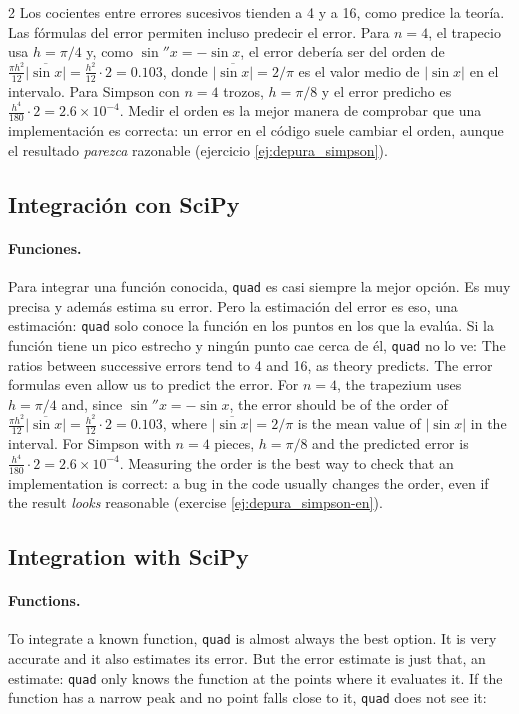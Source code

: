 \begin{paracol}{2}
Los cocientes entre errores sucesivos tienden a 4 y a 16, como predice la teoría. Las fórmulas del error permiten incluso predecir el error. Para $n=4$, el trapecio usa $h=\pi/4$ y, como $\sin''x=-\sin x$, el error debería ser del orden de $\frac{\pi h^2}{12}\overline{\lvert\sin x\rvert}=\frac{h^2}{12}\cdot 2=0.103$, donde $\overline{\lvert\sin x\rvert}=2/\pi$ es el valor medio de $\lvert\sin x\rvert$ en el intervalo. Para Simpson con $n=4$ trozos, $h=\pi/8$ y el error predicho es $\frac{h^4}{180}\cdot 2=2.6\times10^{-4}$. Medir el orden es la mejor manera de comprobar que una implementación es correcta: un error en el código suele cambiar el orden, aunque el resultado \emph{parezca} razonable (ejercicio \ref{ej:depura_simpson}).

\subsection{Integración con SciPy}
\paragraph*{Funciones.} Para integrar una función conocida, \texttt{quad} es casi siempre la mejor opción. Es muy precisa y además estima su error. Pero la estimación del error es eso, una estimación: \texttt{quad} solo conoce la función en los puntos en los que la evalúa. Si la función tiene un pico estrecho y ningún punto cae cerca de él, \texttt{quad} no lo ve:
\switchcolumn
The ratios between successive errors tend to 4 and 16, as theory predicts. The error formulas even allow us to predict the error. For $n=4$, the trapezium uses $h=\pi/4$ and, since $\sin''x=-\sin x$, the error should be of the order of $\frac{\pi h^2}{12}\overline{\lvert\sin x\rvert}=\frac{h^2}{12}\cdot 2=0.103$, where $\overline{\lvert\sin x\rvert}=2/\pi$ is the mean value of $\lvert\sin x\rvert$ in the interval. For Simpson with $n=4$ pieces, $h=\pi/8$ and the predicted error is $\frac{h^4}{180}\cdot 2=2.6\times10^{-4}$. Measuring the order is the best way to check that an implementation is correct: a bug in the code usually changes the order, even if the result \emph{looks} reasonable (exercise \ref{ej:depura_simpson-en}).

\subsection{Integration with SciPy}
\paragraph*{Functions.} To integrate a known function, \texttt{quad} is almost always the best option. It is very accurate and it also estimates its error. But the error estimate is just that, an estimate: \texttt{quad} only knows the function at the points where it evaluates it. If the function has a narrow peak and no point falls close to it, \texttt{quad} does not see it:
\end{paracol}

